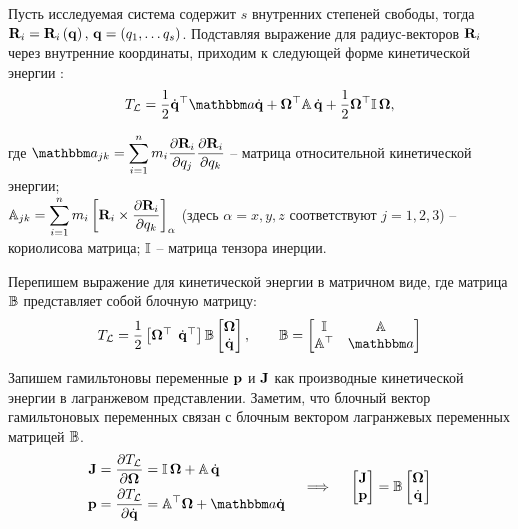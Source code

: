 Пусть исследуемая система содержит $s$ внутренних степеней свободы, тогда $\mathbf{R}_i = \mathbf{R}_i \left( \mathbf{q} \right), \, \mathbf{q} = \left( q_1, \dots q_s \right)$. Подставляя выражение для радиус-векторов $\mathbf{R}_i$ через внутренние координаты, приходим к следующей форме кинетической энергии \cite{petrov2015}:
\vverh
\begin{gather}
	T_\mL = \frac{1}{2} \dot{\mf{q}}^\top \bba \dot{\mf{q}} + \mf{\Omega}^\top \bbA \, \dot{\mf{q}} + \frac{1}{2} \mf{\Omega}^\top \bbI \, \mf{\Omega}, \notag
\end{gather}

где $\bba_{jk} = \displaystyle \sum_{i=1}^{n} m_i \displaystyle \frac{\partial \mf{R}_i}{\partial q_j} \frac{\partial \mf{R}_i}{\partial q_k}$ -- матрица относительной кинетической энергии; \\ 
$\mathbb{A}_{jk} = \displaystyle \sum_{i=1}^{n} m_i \left[ \mathbf{R}_i \times \displaystyle \frac{\partial \mathbf{R}_i}{\partial q_k} \right]_\alpha$ (здесь $\alpha = x, y, z$ соответствуют $j = 1, 2, 3$) -- кориолисова матрица; $\mathbb{I}$ -- матрица тензора инерции. \par
Перепишем выражение для кинетической энергии в матричном виде, где матрица $\mathbb{B}$ представляет собой блочную матрицу:
\vverh
\begin{gather}
	T_\mL = \frac{1}{2}
	\begin{bmatrix}
		\mf{\Omega}^\top & \hspace*{-2mm} \dot{\mf{q}}^\top
	\end{bmatrix}
	\bbB
	\begin{bmatrix}
		\mf{\Omega} \\ 
		\dot{\mf{q}}
	\end{bmatrix},
	\quad \quad
	\bbB = 
	\begin{bmatrix}
		\bbI & \bbA \\
		\bbA^\top & \bba
	\end{bmatrix}
	\notag
\end{gather}

Запишем гамильтоновы переменные $\mathbf{p}$ и $\mathbf{J}$ как производные кинетической энергии в лагранжевом представлении. Заметим, что блочный вектор гамильтоновых переменных связан с блочным вектором лагранжевых переменных матрицей $\mathbb{B}$.
\vverh
\begin{gather}
	\begin{aligned}
		\mf{J} &= \frac{\partial T_\mL}{\partial \mf{\Omega}} = \bbI \, \mf{\Omega} + \bbA \, \dot{\mf{q}} \\
		\mf{p} &= \frac{\partial T_\mL}{\partial \dot{\mf{q}}} = \bbA^\top \mf{\Omega} + \bba \dot{\mf{q}}
	\end{aligned}
	\quad \implies \quad
	\begin{bmatrix}
		\mf{J} \\
		\mf{p}
	\end{bmatrix} = 
	\bbB
	\begin{bmatrix}
		\mf{\Omega} \\
		\dot{\mf{q}}
	\end{bmatrix} \notag
\end{gather}

